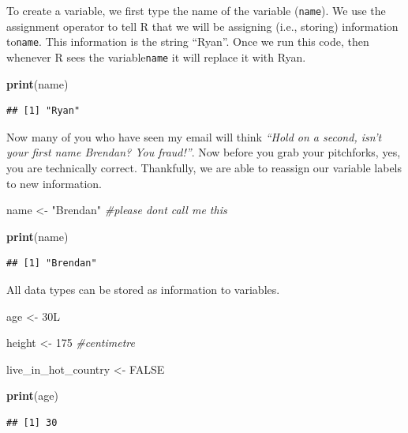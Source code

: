 \documentclass[
]{book}
\newenvironment{Shaded}{\begin{snugshade}}{\end{snugshade}}
\newcommand{\CommentTok}[1]{\textcolor[rgb]{0.56,0.35,0.01}{\textit{#1}}}
\newcommand{\ConstantTok}[1]{\textcolor[rgb]{0.56,0.35,0.01}{#1}}
\newcommand{\DecValTok}[1]{\textcolor[rgb]{0.00,0.00,0.81}{#1}}
\newcommand{\FunctionTok}[1]{\textcolor[rgb]{0.13,0.29,0.53}{\textbf{#1}}}
\newcommand{\NormalTok}[1]{#1}
\newcommand{\OtherTok}[1]{\textcolor[rgb]{0.56,0.35,0.01}{#1}}
\newcommand{\StringTok}[1]{\textcolor[rgb]{0.31,0.60,0.02}{#1}}
\begin{document}
To create a variable, we first type the name of the variable (\texttt{name}). We use the assignment operator to tell R that we will be assigning (i.e., storing) information to\texttt{name}. This information is the string ``Ryan''. Once we run this code, then whenever R sees the variable\texttt{name} it will replace it with Ryan.

\begin{Shaded}
\begin{Highlighting}[]
\FunctionTok{print}\NormalTok{(name)}
\end{Highlighting}
\end{Shaded}

\begin{verbatim}
## [1] "Ryan"
\end{verbatim}

Now many of you who have seen my email will think \emph{``Hold on a second, isn't your first name Brendan? You fraud!''}. Now before you grab your pitchforks, yes, you are technically correct. Thankfully, we are able to reassign our variable labels to new information.

\begin{Shaded}
\begin{Highlighting}[]
\NormalTok{name }\OtherTok{\textless{}{-}} \StringTok{"Brendan"} \CommentTok{\#please don\textquotesingle{}t call me this}

\FunctionTok{print}\NormalTok{(name)}
\end{Highlighting}
\end{Shaded}

\begin{verbatim}
## [1] "Brendan"
\end{verbatim}

All data types can be stored as information to variables.

\begin{Shaded}
\begin{Highlighting}[]
\NormalTok{age }\OtherTok{\textless{}{-}}\NormalTok{ 30L}

\NormalTok{height }\OtherTok{\textless{}{-}} \DecValTok{175} \CommentTok{\#centimetre }

\NormalTok{live\_in\_hot\_country }\OtherTok{\textless{}{-}} \ConstantTok{FALSE}

\FunctionTok{print}\NormalTok{(age)}
\end{Highlighting}
\end{Shaded}

\begin{verbatim}
## [1] 30
\end{verbatim}
\end{document}
